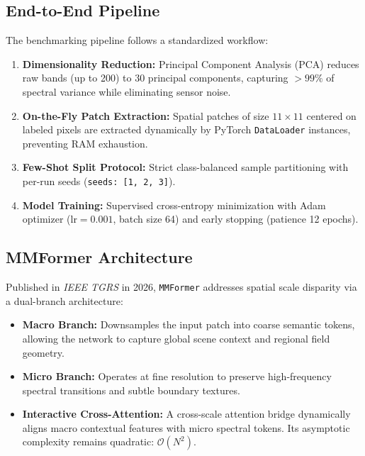 \documentclass[conference]{IEEEtran}
\begin{document}
\subsection{End-to-End Pipeline}
The benchmarking pipeline follows a standardized workflow:
\begin{enumerate}
    \item \textbf{Dimensionality Reduction:} Principal Component Analysis (PCA) reduces raw bands (up to 200) to 30 principal components, capturing $>99\%$ of spectral variance while eliminating sensor noise.
    \item \textbf{On-the-Fly Patch Extraction:} Spatial patches of size $11 \times 11$ centered on labeled pixels are extracted dynamically by PyTorch \texttt{DataLoader} instances, preventing RAM exhaustion.
    \item \textbf{Few-Shot Split Protocol:} Strict class-balanced sample partitioning with per-run seeds (\texttt{seeds: [1, 2, 3]}).
    \item \textbf{Model Training:} Supervised cross-entropy minimization with Adam optimizer ($\text{lr}=0.001$, batch size 64) and early stopping (patience 12 epochs).
\end{enumerate}

\subsection{MMFormer Architecture}
Published in \textit{IEEE TGRS} in 2026, \texttt{MMFormer} \cite{mmformer} addresses spatial scale disparity via a dual-branch architecture:
\begin{itemize}
    \item \textbf{Macro Branch:} Downsamples the input patch into coarse semantic tokens, allowing the network to capture global scene context and regional field geometry.
    \item \textbf{Micro Branch:} Operates at fine resolution to preserve high-frequency spectral transitions and subtle boundary textures.
    \item \textbf{Interactive Cross-Attention:} A cross-scale attention bridge dynamically aligns macro contextual features with micro spectral tokens. Its asymptotic complexity remains quadratic: $\mathcal{O}(N^2)$.
\end{itemize}
\end{document}
